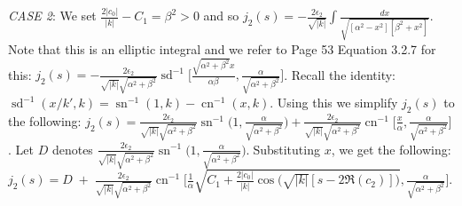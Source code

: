 \documentclass[12pt]{article}
\theoremstyle{plain}
\theoremstyle{definition}
\theoremstyle{remark}
\begin{document}
  \textit{CASE 2}: We set \(\tfrac{2|c_0|}{|k|}-C_1=\beta^2>0\) and so \(j_2(s)=-\tfrac{2\epsilon_2}{\sqrt{|k|}}\int \tfrac{dx}{\sqrt{[\alpha^2-x^2][\beta^2+x^2]}}\). Note that this is an elliptic integral and we refer to \cite{La} Page 53 Equation 3.2.7 for this: \footnotesize\(j_2(s)=-\tfrac{2\epsilon_2}{\sqrt{|k|}\sqrt{\alpha^2+\beta^2}}\operatorname{sd}^{-1}\Big[\tfrac{\sqrt{\alpha^2+\beta^2}x}{\alpha\beta},\tfrac{\alpha}{\sqrt{\alpha^2+\beta^2}}\Big]\)\normalsize.  Recall the identity: $\operatorname{sd}^{-1}(x/k',k)=\operatorname{sn}^{-1}(1,k)-\operatorname{cn}^{-1}(x,k)$. Using this we simplify \(j_2(s)\) to the following: \footnotesize\(j_2(s)=\tfrac{2\epsilon_2}{\sqrt{|k|}\sqrt{\alpha^2+\beta^2}}\operatorname{sn}^{-1}\big(1,\tfrac{\alpha}{\sqrt{\alpha^2+\beta^2}}\big)+\tfrac{2\epsilon_2}{\sqrt{|k|}\sqrt{\alpha^2+\beta^2}}\operatorname{cn}^{-1}\Big[\tfrac{x}{\alpha},\tfrac{\alpha}{\sqrt{\alpha^2+\beta^2}}\Big]\)\normalsize. Let \(D\) denotes \footnotesize\(\tfrac{2\epsilon_2}{\sqrt{|k|}\sqrt{\alpha^2+\beta^2}}\operatorname{sn}^{-1}\big(1,\tfrac{\alpha}{\sqrt{\alpha^2+\beta^2}}\big).\;\)\normalsize Substituting \(x\), we get the following: \footnotesize\(j_2(s)=D\;+\;\tfrac{2\epsilon_2}{\sqrt{|k|}\sqrt{\alpha^2+\beta^2}}\operatorname{cn}^{-1}\Big[\tfrac{1}{\alpha}\sqrt{C_1 + \tfrac{2|c_0|}{|k|}\cos\big(\sqrt{|k|}[s-2\Re(c_2)]\big)},\tfrac{\alpha}{\sqrt{\alpha^2+\beta^2}}\Big]\)\normalsize. 
\end{document}
